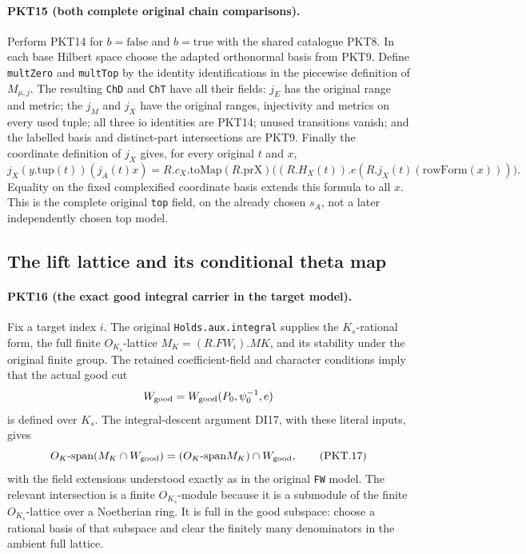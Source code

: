 \paragraph{PKT15 (both complete original chain comparisons).}\label{claim:PKT15}
Perform PKT14 for $b=\mathrm{false}$ and $b=\mathrm{true}$ with the shared
catalogue PKT8.  In each base Hilbert space choose the adapted orthonormal
basis from PKT9.  Define \texttt{multZero} and \texttt{multTop} by the
identity identifications in the piecewise definition of $M_{\mu,j}$.
The resulting \texttt{ChD} and \texttt{ChT} have all their fields:
$j_E$ has the original range and metric; the $j_M$ and $j_X$ have the
original ranges, injectivity and metrics on every used tuple; all three
$\mathrm{io}$ identities are PKT14; unused transitions vanish; and the
labelled basis and distinct-part intersections are PKT9.  Finally the
coordinate definition of $j_X$ gives, for every original $t$ and $x$,
\[
 j_X(y.\mathrm{tup}(t))(j_A(t)x)
 =R.c_X.\mathrm{toMap}(R.\mathrm{prX})
       \bigl((R.H_X(t)).e(R.j_X(t)(\mathrm{rowForm}(x)))\bigr).
 \tag{PKT.16}
\]
Equality on the fixed complexified coordinate basis extends this formula
to all $x$.  This is the complete original \texttt{top} field, on the
already chosen $s_A$, not a later independently chosen top model.

\subsection{The lift lattice and its conditional theta map}

\paragraph{PKT16 (the exact good integral carrier in the target model).}\label{claim:PKT16}
Fix a target index $i$.  The original \texttt{Holds.aux.integral} supplies
the $K_s$-rational form, the full finite $O_{K_s}$-lattice
$M_K=(R.FW_i).MK$, and its stability under the original finite group.  The retained coefficient-field
and character conditions imply that the actual good cut
\[
 W_{\rm good}=W_{\rm good}(P_0,\psi_0^{-1},e)
\]
is defined over $K_s$.  The integral-descent argument DI17, with these
literal inputs, gives
\[
 O_K\text{-span}(M_K\cap W_{\rm good})
   =(O_K\text{-span}M_K)\cap W_{\rm good},
 \tag{PKT.17}
\]
with the field extensions understood exactly as in the original
\texttt{FW} model.  The relevant intersection is a finite $O_{K_s}$-module because
it is a submodule of the finite $O_{K_s}$-lattice over a Noetherian ring.  It is full
in the good subspace: choose a rational basis of that subspace and clear
the finitely many denominators in the ambient full lattice.

